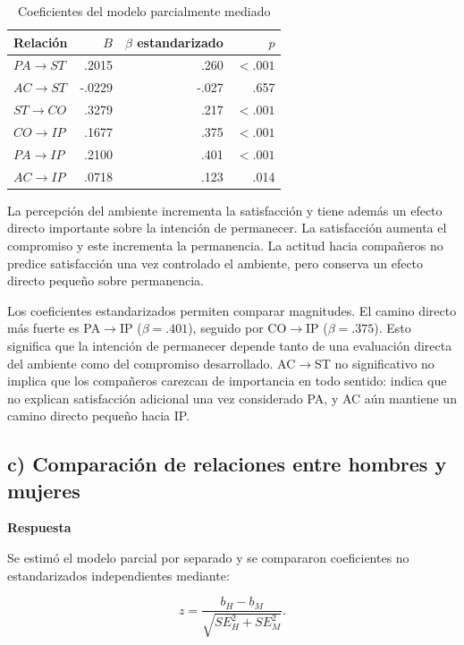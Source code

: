 \documentclass[11pt,letterpaper]{article}
\begin{document}
\begin{table}[H]
\centering
\caption{Coeficientes del modelo parcialmente mediado}
\begin{tabular}{lrrr}
\toprule
Relación & $B$ & $\beta$ estandarizado & $p$\\
\midrule
$PA\rightarrow ST$ & .2015 & .260 & $<.001$\\
$AC\rightarrow ST$ & -.0229 & -.027 & .657\\
$ST\rightarrow CO$ & .3279 & .217 & $<.001$\\
$CO\rightarrow IP$ & .1677 & .375 & $<.001$\\
$PA\rightarrow IP$ & .2100 & .401 & $<.001$\\
$AC\rightarrow IP$ & .0718 & .123 & .014\\
\bottomrule
\end{tabular}
\end{table}

La percepción del ambiente incrementa la satisfacción y tiene además un efecto directo importante sobre la intención de permanecer. La satisfacción aumenta el compromiso y este incrementa la permanencia. La actitud hacia compañeros no predice satisfacción una vez controlado el ambiente, pero conserva un efecto directo pequeño sobre permanencia.

Los coeficientes estandarizados permiten comparar magnitudes. El camino directo más fuerte es PA$\rightarrow$IP ($\beta=.401$), seguido por CO$\rightarrow$IP ($\beta=.375$). Esto significa que la intención de permanecer depende tanto de una evaluación directa del ambiente como del compromiso desarrollado. AC$\rightarrow$ST no significativo no implica que los compañeros carezcan de importancia en todo sentido: indica que no explican satisfacción adicional una vez considerado PA, y AC aún mantiene un camino directo pequeño hacia IP.

\subsection{c) Comparación de relaciones entre hombres y mujeres}

\textbf{Respuesta}

Se estimó el modelo parcial por separado y se compararon coeficientes no estandarizados independientes mediante:

\[
z=\frac{b_H-b_M}{\sqrt{SE_H^2+SE_M^2}}.
\]
\end{document}
